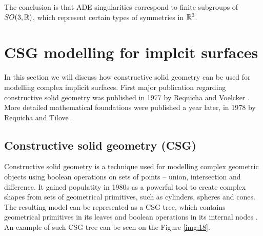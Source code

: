 The conclusion is that ADE singularities correspond to finite subgroups of
$SO(3, \mathbb{R})$, which represent certain types of symmetries in $\mathbb{R}^3$.

\section{CSG modelling for implcit surfaces}
\label{sub2.6}
In this section we will discuss how constructive solid geometry can be used for
modelling complex implicit surfaces. First major publication regarding constructive
solid geometry was published in 1977 by Requicha and Voelcker \cite{requicha1977constructive}.
More detailed mathematical foundations were published a year later, in 1978 by
Requicha and Tilove \cite{requicha1978mathematical}.
\subsection{Constructive solid geometry (CSG)}
Constructive solid geometry is a technique used for modelling complex geometric
objects using boolean operations on sets of points -- union, intersection and
difference. It gained populatity in 1980s as a powerful tool to create complex
shapes from sets of geometrical primitives, such as cylinders, spheres and cones.
The resulting model can be represented as a CSG tree, which contains geometrical
primitives in its leaves and boolean operations in its internal nodes 
\cite{foley1996computer}. An example of such CSG tree can be seen on the Figure 
\ref{img:18}.

